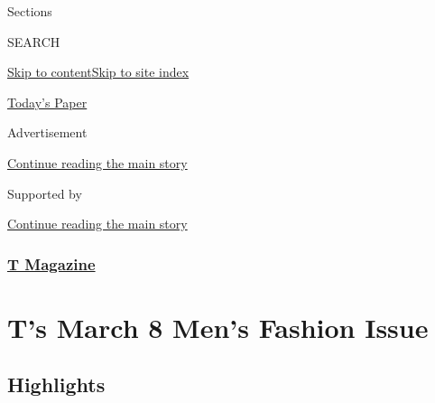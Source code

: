 Sections

SEARCH

\protect\hyperlink{site-content}{Skip to
content}\protect\hyperlink{site-index}{Skip to site index}

\href{https://myaccount.nytimes3xbfgragh.onion/auth/login?response_type=cookie\&client_id=vi}{}

\href{https://www.nytimes3xbfgragh.onion/section/todayspaper}{Today's
Paper}

Advertisement

\protect\hyperlink{after-top}{Continue reading the main story}

Supported by

\protect\hyperlink{after-sponsor}{Continue reading the main story}

\hypertarget{t-magazine}{%
\subsubsection{\texorpdfstring{\href{/section/t-magazine}{T
Magazine}}{T Magazine}}\label{t-magazine}}

\hypertarget{ts-march-8-mens-fashion-issue}{%
\section{T's March 8 Men's Fashion
Issue}\label{ts-march-8-mens-fashion-issue}}

\hypertarget{highlights}{%
\subsection{Highlights}\label{highlights}}

